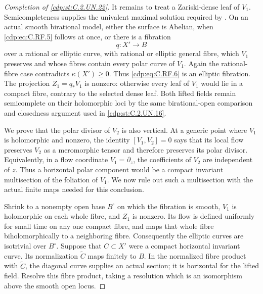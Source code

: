 \begin{proof}[Completion of \ref{cdp:st:C.2.UN.22}]
It remains to treat a Zariski-dense leaf of $V_1$.
Semicompleteness supplies the univalent maximal solution
required by \cite[Main Theorem and the clarification immediately
following it, p.~2]{Guillot2019}. On an actual smooth
birational model, either the surface is Abelian, when
\eqref{cdp:eq:C.RF.5} follows at once, or there is a fibration
\[
                         q:X'\longrightarrow B
                                                               \tag{C.RF.6}\label{cdp:eq:C.RF.6}
\]
over a rational or elliptic curve, with rational or elliptic
general fibre, which $V_1$ preserves and whose fibres
contain every polar curve of $V_1$. Again the rational-fibre
case contradicts $\kappa(X')\ge0$. Thus \eqref{cdp:eq:C.RF.6} is an
elliptic fibration. The projection $Z_1=q_*V_1$ is nonzero:
otherwise every leaf of $V_1$ would lie in a compact fibre,
contrary to the selected dense leaf. Both lifted fields
remain semicomplete on their holomorphic loci by the same
birational-open comparison and closedness argument used
in \ref{cdp:st:C.2.UN.16}.

We prove that the polar divisor of $V_2$ is also vertical.
At a generic point where $V_1$ is holomorphic and nonzero,
the identity $[V_1,V_2]=0$ says that its local flow preserves
$V_2$ as a meromorphic tensor and therefore preserves its
polar divisor. Equivalently, in a flow coordinate
$V_1=\partial_z$, the coefficients of $V_2$ are independent
of $z$. Thus a horizontal polar component would be a
compact invariant multisection of the foliation of $V_1$.
We now rule out such a multisection with the actual finite
maps needed for this conclusion.

Shrink to a nonempty open base $B^\circ$ on which the
fibration is smooth, $V_1$ is holomorphic on each whole
fibre, and $Z_1$ is nonzero. Its flow is defined uniformly
for small time on any one compact fibre, and maps that
whole fibre biholomorphically to a neighboring fibre.
Consequently the elliptic curves are isotrivial over
$B^\circ$. Suppose that $C\subset X'$ were a compact
horizontal invariant curve. Its normalization $\widetilde C$
maps finitely to $B$. In the normalized fibre product with
$\widetilde C$, the diagonal curve supplies an actual
section; it is horizontal for the lifted field. Resolve
this fibre product, taking a resolution which is an
isomorphism above the smooth open locus.


\end{proof}
